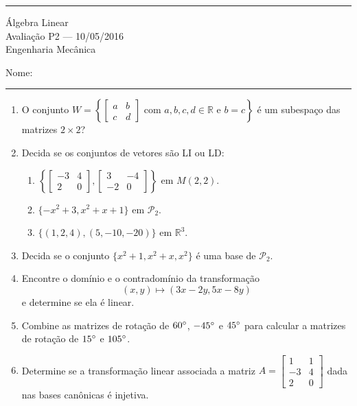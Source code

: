 \documentclass{article}
\begin{document}
\noindent{}\rule{\textwidth}{0.4pt}
\begin{center}
	\'{A}lgebra Linear\\
	Avalia\c{c}\~ao P2 --- 10/05/2016 \\
	Engenharia Mec\^anica \\
	\vspace{0.2cm}
\end{center}
Nome: \\
\noindent{}\rule{\textwidth}{0.4pt}

\begin{enumerate}
\item O conjunto
	$W = \left\{
		\left[\begin{array}{cc}
			a & b \\
			c & d
		\end{array}\right] \mbox{ com }
	a, b, c, d \in \mathbb{R} \mbox{ e } b = c\right\}$
\'e um subespa\c{c}o das matrizes $2\times 2$?

\item Decida se os conjuntos de vetores s\~ao LI ou LD:
	\begin{enumerate}
		\item $\left\{
			\left[\begin{array}{cc}
				-3 & 4 \\
				2 & 0
			\end{array}\right], 
			\left[\begin{array}{cc}
				3 & -4 \\
				-2 & 0
			\end{array}\right]\right\}$
		em $M(2, 2)$.
		\item $\{-x^2+3, x^2+x+1\}$ em $\mathcal{P}_2$.
		\item $\{(1, 2, 4), (5, -10, -20)\}$ em $\mathbb{R}^3$.
	\end{enumerate}

\item Decida se o conjunto $\{x^2+1, x^2+x, x^2\}$ \'e uma base de $\mathcal{P}_2$.

\item Encontre o dom\'inio e o contradom\'inio da transforma\c{c}\~ao	$$(x, y) \mapsto
	(3x-2y, 5x-8y)$$ e determine se ela \'e linear.

\item Combine as matrizes de rota\c{c}\~ao de $60\degree$, $-45\degree$ e $45\degree$ para calcular a matrizes de
	rota\c{c}\~ao de $15\degree$ e $105\degree$.

\item Determine se a transforma\c{c}\~ao linear associada a matriz
	$A=\left[\begin{array}{cc}
			1 & 1 \\
			-3 & 4 \\
			2 & 0
		\end{array}\right]$
	dada nas bases can\^onicas \'e injetiva.

\end{enumerate}
\end{document}

